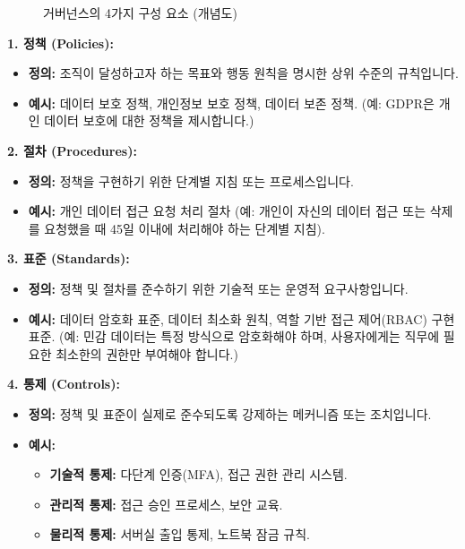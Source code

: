 \documentclass[11pt,a4paper]{article}
\theoremstyle{definition}
\begin{document}
\begin{figure}[h!]
    \centering
    \caption{거버넌스의 4가지 구성 요소 (개념도)}
    \label{fig:gov_holistic}
\end{figure}

\textbf{1. 정책 (Policies):}
\begin{itemize}
    \item \textbf{정의:} 조직이 달성하고자 하는 목표와 행동 원칙을 명시한 상위 수준의 규칙입니다.
    \item \textbf{예시:} 데이터 보호 정책, 개인정보 보호 정책, 데이터 보존 정책. (예: GDPR은 개인 데이터 보호에 대한 정책을 제시합니다.)
\end{itemize}

\textbf{2. 절차 (Procedures):}
\begin{itemize}
    \item \textbf{정의:} 정책을 구현하기 위한 단계별 지침 또는 프로세스입니다.
    \item \textbf{예시:} 개인 데이터 접근 요청 처리 절차 (예: 개인이 자신의 데이터 접근 또는 삭제를 요청했을 때 45일 이내에 처리해야 하는 단계별 지침).
\end{itemize}

\textbf{3. 표준 (Standards):}
\begin{itemize}
    \item \textbf{정의:} 정책 및 절차를 준수하기 위한 기술적 또는 운영적 요구사항입니다.
    \item \textbf{예시:} 데이터 암호화 표준, 데이터 최소화 원칙, 역할 기반 접근 제어(RBAC) 구현 표준. (예: 민감 데이터는 특정 방식으로 암호화해야 하며, 사용자에게는 직무에 필요한 최소한의 권한만 부여해야 합니다.)
\end{itemize}

\textbf{4. 통제 (Controls):}
\begin{itemize}
    \item \textbf{정의:} 정책 및 표준이 실제로 준수되도록 강제하는 메커니즘 또는 조치입니다.
    \item \textbf{예시:}
    \begin{itemize}
        \item \textbf{기술적 통제:} 다단계 인증(MFA), 접근 권한 관리 시스템.
        \item \textbf{관리적 통제:} 접근 승인 프로세스, 보안 교육.
        \item \textbf{물리적 통제:} 서버실 출입 통제, 노트북 잠금 규칙.
    \end{itemize}
\end{itemize}
\end{document}
